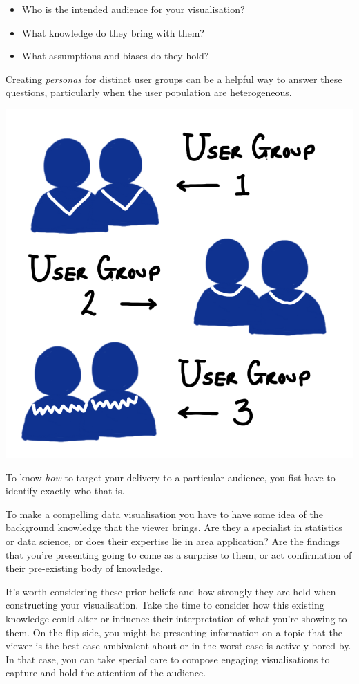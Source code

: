\documentclass[
  12pt,
]{book}
\begin{document}
\begin{itemize}
\item
  Who is the intended audience for your visualisation?
\item
  What knowledge do they bring with them?
\item
  What assumptions and biases do they hold?
\end{itemize}

Creating \emph{personas} for distinct user groups can be a helpful way to answer these questions, particularly when the user population are heterogeneous.

\includegraphics{images/303-data-visualisation/user-groups.png}

To know \emph{how} to target your delivery to a particular audience, you fist have to identify exactly who that is.

To make a compelling data visualisation you have to have some idea of the background knowledge that the viewer brings. Are they a specialist in statistics or data science, or does their expertise lie in area application? Are the findings that you're presenting going to come as a surprise to them, or act confirmation of their pre-existing body of knowledge.

It's worth considering these prior beliefs and how strongly they are held when constructing your visualisation. Take the time to consider how this existing knowledge could alter or influence their interpretation of what you're showing to them. On the flip-side, you might be presenting information on a topic that the viewer is the best case ambivalent about or in the worst case is actively bored by. In that case, you can take special care to compose engaging visualisations to capture and hold the attention of the audience.
\end{document}
